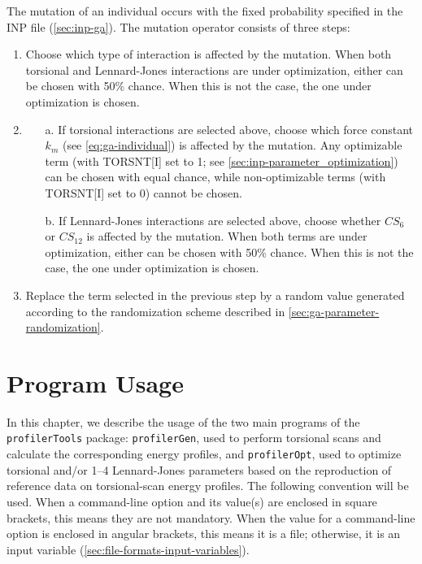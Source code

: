 \documentclass[10pt,a4paper]{report}
\numberwithin{equation}{section}
\newcommand{\profileropt}[0]{\texttt{profilerOpt}}
\newcommand{\profilergen}[0]{\texttt{profilerGen}}
\newcommand{\profilertools}[0]{\texttt{profilerTools}}
\begin{document}
The mutation of an individual occurs with the fixed probability specified in the
INP file (\autoref{sec:inp-ga}). The mutation operator
consists of three steps:
\begin{enumerate}
\item Choose which type of interaction is affected by the mutation.  When both
  torsional and Lennard-Jones interactions are under optimization, either can be
  chosen with 50\% chance.  When this is not the case, the one under
  optimization is chosen.
\item
  \begin{enumerate}
  \item [a.] If torsional interactions are selected above, choose
    which force constant $k_m$ (see \autoref{eq:ga-individual}) is
    affected by the mutation. Any optimizable term (with TORSNT[I] set
    to 1; see \autoref{sec:inp-parameter_optimization}) can be chosen with equal
    chance, while non-optimizable terms (with TORSNT[I] set to 0)
    cannot be chosen.
  \item [b.] If Lennard-Jones interactions are selected above, choose whether $CS_6$ or
    $CS_{12}$ is affected by the mutation. When both terms are under
    optimization, either can be chosen with 50\% chance. When this is not the
    case, the one under optimization is chosen.
  \end{enumerate}
\item Replace the term selected in the previous step by a random value generated
  according to the randomization scheme described in
  \autoref{sec:ga-parameter-randomization}.
\end{enumerate}

\chapter{Program Usage}
\label{chap:program-usage}

In this chapter, we describe the usage of the two main programs of the \profilertools{} package:
\profilergen{}, used to perform torsional scans and calculate the corresponding energy profiles, and
\profileropt{}, used to optimize torsional and/or 1--4 Lennard-Jones parameters based on the reproduction of reference data on torsional-scan energy profiles.
The following convention will be used.
When a command-line option and its value(s) are enclosed in square brackets, this means they are not mandatory.
When the value for a command-line option is enclosed in angular brackets, this means it is a file;
otherwise, it is an input variable (\autoref{sec:file-formats-input-variables}).
\end{document}
